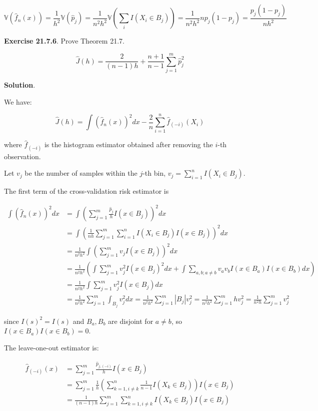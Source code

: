 \[\mathbb{V}(\hat{f}_{n}(x)) = \frac{1}{h^{2}} \mathbb{V}(\hat{p}_{j}) = \frac{1}{n^{2}h^{2}} \mathbb{V}\left( \sum_{i} I(X_{i} \in B_{j}) \right) = \frac{1}{n^{2}h^{2}} n p_{j} (1 - p_{j}) = \frac{p_{j} (1 - p_{j})}{nh^{2}} \]

\textbf{Exercise 21.7.6}. Prove Theorem 21.7.

\[ \hat{J}(h) = \frac{2}{(n - 1)h} + \frac{n+1}{n-1} \sum_{j=1}^m \hat{p}_{j}^{2} \]

\textbf{Solution}.

We have:

\[ \hat{J}(h) = \int \left( \hat{f}_{n}(x) \right)^{2} dx - \frac{2}{n} \sum_{i=1}^{n} \hat{f}_{(-i)}(X_{i})\]

where \(\hat{f}_{(-i)}\) is the histogram estimator obtained after
removing the \(i\)-th observation.

Let \(v_{j}\) be the number of samples within the \(j\)-th bin,
\(v_{j} = \sum_{i=1}^{n} I(X_{i} \in B_{j})\).

The first term of the cross-validation risk estimator is

\begin{align*}
\int \left( \hat{f}_{n}(x) \right)^{2} dx &= \int \left( \sum_{j=1}^m \frac{\hat{p}_{j}}{h} I(x \in B_{j}) \right)^{2} dx\\
&= \int \left( \frac{1}{nh}  \sum_{j=1}^m \sum_{i=1}^{n} I(X_{i} \in B_{j}) I(x \in B_{j}) \right)^{2} dx \\
&= \frac{1}{n^{2}h^{2}} \int \left( \sum_{j=1}^m v_{j} I(x \in B_{j}) \right)^{2} dx \\
&= \frac{1}{n^{2}h^{2}} \left( \int \sum_{j=1}^m v_{j}^{2} I(x \in B_{j})^{2} dx  + \int \sum_{a, b; a \neq b}  v_a v_b I(x \in B_a) I(x \in B_b) dx\right) \\
&= \frac{1}{n^{2}h^{2}} \int \sum_{j=1}^m v_{j}^{2} I(x \in B_{j}) dx \\
&= \frac{1}{n^{2}h^{2}} \sum_{j=1}^m \int_{B_{j}} v_{j}^{2} dx = \frac{1}{n^{2}h^{2}} \sum_{j=1}^m \left| B_{j} \right| v_{j}^{2} = \frac{1}{n^{2}h^{2}} \sum_{j=1}^m h v_{j}^{2} = \frac{1}{n^{2}h} \sum_{j=1}^m v_{j}^{2}
\end{align*}

since \(I(s)^{2} = I(s)\) and \(B_a, B_b\) are disjoint for \(a \neq b\),
so \(I(x \in B_a) I(x \in B_b) = 0\).

The leave-one-out estimator is:

\begin{align*}
\hat{f}_{(-i)}(x) &= \sum_{j=1}^m \frac{\hat{p}_{j, (-i)}}{h} I(x \in B_{j}) \\
&= \sum_{j=1}^m \frac{1}{h} \left( \sum_{k=1, i \neq k}^{n} \frac{1}{n - 1} I(X_{k} \in B_{j}) \right) I(x \in B_{j}) \\
&= \frac{1}{(n - 1)h} \sum_{j=1}^m \sum_{k=1, i \neq k}^{n} I(X_{k} \in B_{j}) I(x \in B_{j})
\end{align*}

